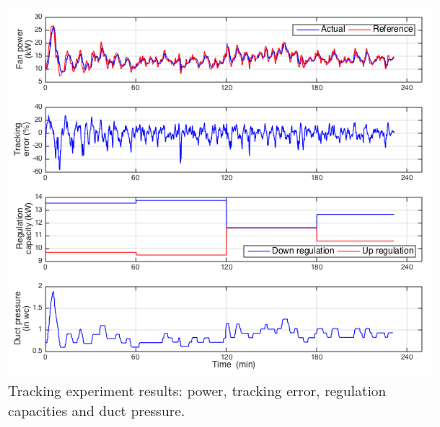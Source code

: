 
\begin{figure}[t]
\centering
\includegraphics[scale=0.40]{chapters/building_exp/figures/Track_power.png}
\caption{Tracking experiment results: power, tracking error, regulation capacities and duct pressure.}
\label{fig:track_power}
\end{figure}


